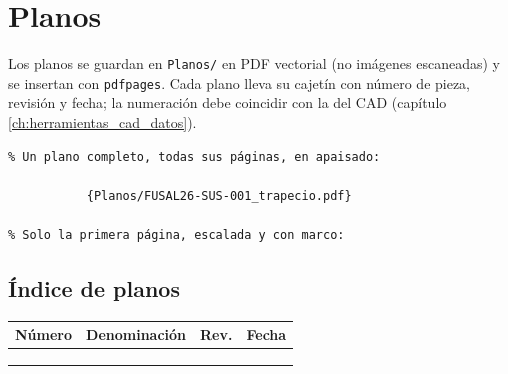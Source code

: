 \chapter{Planos}
\label{ch:planos}


Los planos se guardan en \texttt{Planos/} en PDF vectorial (no imágenes
escaneadas) y se insertan con \texttt{pdfpages}. Cada plano lleva su cajetín con
número de pieza, revisión y fecha; la numeración debe coincidir con la del CAD
(capítulo \ref{ch:herramientas_cad_datos}).

\begin{verbatim}
% Un plano completo, todas sus páginas, en apaisado:

           {Planos/FUSAL26-SUS-001_trapecio.pdf}

% Solo la primera página, escalada y con marco:

\end{verbatim}

\section{Índice de planos}
\label{sec:indice_planos}

\begin{center}
\begin{tabular}{@{}llll@{}}
\toprule
\textbf{Número} & \textbf{Denominación} & \textbf{Rev.} & \textbf{Fecha} \\
\midrule
 & & & \\
 & & & \\
 & & & \\
\bottomrule
\end{tabular}
\end{center}
